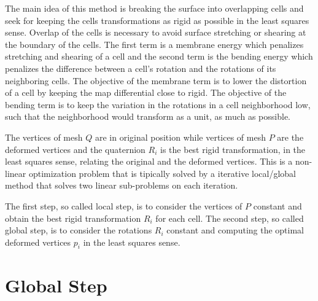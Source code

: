 \documentclass{birkjour}
\numberwithin{equation}{section}
\begin{document}
The main idea of this method is breaking the surface into overlapping cells and seek for keeping the cells transformations as rigid as possible in the least squares sense. Overlap of the cells is necessary to avoid surface stretching or shearing at the boundary of the cells. 
The first term is a membrane energy which penalizes stretching and shearing of a cell and the second term is the bending energy which penalizes the difference between a cell's rotation and the rotations of its neighboring cells. 
The objective of the membrane term is to lower the distortion of a cell by keeping the map differential close to rigid. 
The objective of the bending term is to keep the variation in the rotations in a cell neighborhood low, such that the neighborhood would transform as a unit, as much as possible. 

The vertices of mesh $Q$ are in original position while vertices of mesh $P$ are the deformed vertices and the quaternion $R_i$ is the best rigid transformation, in the least squares sense, relating the original and the deformed vertices.
This is a non-linear optimization problem that is tipically solved by a iterative local/global method that solves two linear sub-problems on each iteration. 

The first step, so called local step, is to consider the vertices of $P$ constant and obtain the best rigid transformation $R_i$ for each cell. The second step, so called global step, is to consider the rotations $R_i$ constant and computing the optimal deformed vertices $p_i$ in the least squares sense. 

\section{Global Step}
\end{document}
